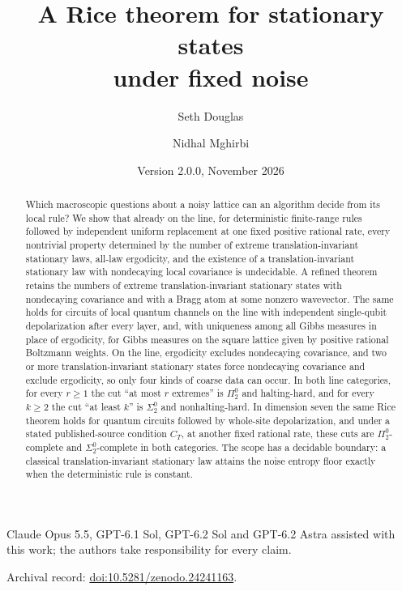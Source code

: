 \documentclass[11pt]{amsart}
\title[Stationary states under fixed noise]{A Rice theorem for stationary states\\under fixed noise}
\author{Seth Douglas}
\author{Nidhal Mghirbi}
\date{Version 2.0.0, November 2026}
\theoremstyle{definition}
\theoremstyle{remark}
\numberwithin{equation}{section}
\begin{document}
\begin{abstract}
Which macroscopic questions about a noisy lattice can an algorithm decide from its local rule? We show that already on the line, for deterministic finite-range rules followed by independent uniform replacement at one fixed positive rational rate, every nontrivial property determined by the number of extreme translation-invariant stationary laws, all-law ergodicity, and the existence of a translation-invariant stationary law with nondecaying local covariance is undecidable. A refined theorem retains the numbers of extreme translation-invariant stationary states with nondecaying covariance and with a Bragg atom at some nonzero wavevector. The same holds for circuits of local quantum channels on the line with independent single-qubit depolarization after every layer, and, with uniqueness among all Gibbs measures in place of ergodicity, for Gibbs measures on the square lattice given by positive rational Boltzmann weights. On the line, ergodicity excludes nondecaying covariance, and two or more translation-invariant stationary states force nondecaying covariance and exclude ergodicity, so only four kinds of coarse data can occur. In both line categories, for every $r\ge1$ the cut ``at most $r$ extremes'' is $\Pi^0_2$ and halting-hard, and for every $k\ge2$ the cut ``at least $k$'' is $\Sigma^0_2$ and nonhalting-hard. In dimension seven the same Rice theorem holds for quantum circuits followed by whole-site depolarization, and under a stated published-source condition $C_T$, at another fixed rational rate, these cuts are $\Pi^0_2$-complete and $\Sigma^0_2$-complete in both categories. The scope has a decidable boundary: a classical translation-invariant stationary law attains the noise entropy floor exactly when the deterministic rule is constant.
\end{abstract}
\maketitle
\begin{center}
\small Claude Opus 5.5, GPT-6.1 Sol, GPT-6.2 Sol and GPT-6.2 Astra assisted with this work; the authors take responsibility for every claim.
\end{center}
\begin{center}\small
Archival record: \href{https://doi.org/10.5281/zenodo.24241163}{doi:10.5281/zenodo.24241163}.
\end{center}














\appendix


\end{document}
